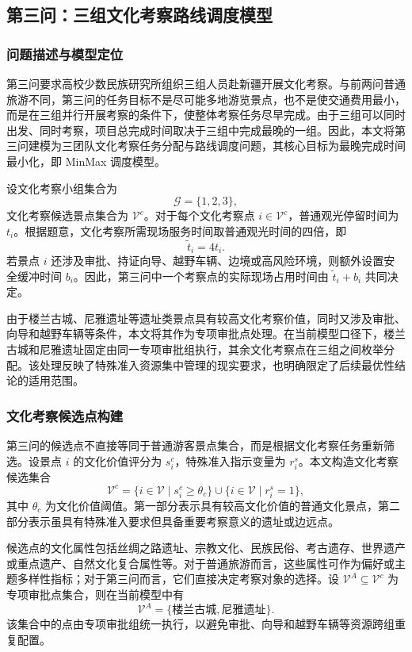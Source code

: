 \documentclass[UTF8,zihao=-4,a4paper]{ctexart}
\begin{document}
\subsection{第三问：三组文化考察路线调度模型}
\label{subsec:q3_model}

\subsubsection{问题描述与模型定位}
\label{subsubsec:q3_problem_position}

第三问要求高校少数民族研究所组织三组人员赴新疆开展文化考察。与前两问普通旅游不同，第三问的任务目标不是尽可能多地游览景点，也不是使交通费用最小，而是在三组并行开展考察的条件下，使整体考察任务尽早完成。由于三组可以同时出发、同时考察，项目总完成时间取决于三组中完成最晚的一组。因此，本文将第三问建模为三团队文化考察任务分配与路线调度问题，其核心目标为最晚完成时间最小化，即 MinMax 调度模型。

设文化考察小组集合为
\[
\mathcal{G}=\{1,2,3\},
\]
文化考察候选景点集合为 $\mathcal{V}^{c}$。对于每个文化考察点 $i\in\mathcal{V}^{c}$，普通观光停留时间为 $t_i$。根据题意，文化考察所需现场服务时间取普通观光时间的四倍，即
\[
\tilde{t}_i=4t_i.
\]
若景点 $i$ 还涉及审批、持证向导、越野车辆、边境或高风险环境，则额外设置安全缓冲时间 $b_i$。因此，第三问中一个考察点的实际现场占用时间由 $\tilde{t}_i+b_i$ 共同决定。

由于楼兰古城、尼雅遗址等遗址类景点具有较高文化考察价值，同时又涉及审批、向导和越野车辆等条件，本文将其作为专项审批点处理。在当前模型口径下，楼兰古城和尼雅遗址固定由同一专项审批组执行，其余文化考察点在三组之间枚举分配。该处理反映了特殊准入资源集中管理的现实要求，也明确限定了后续最优性结论的适用范围。

\subsubsection{文化考察候选点构建}
\label{subsubsec:q3_candidate_set}

第三问的候选点不直接等同于普通游客景点集合，而是根据文化考察任务重新筛选。设景点 $i$ 的文化价值评分为 $s_i^{c}$，特殊准入指示变量为 $r_i^{s}$。本文构造文化考察候选集合
\[
\mathcal{V}^{c}
=
\{i\in\mathcal{V}\mid s_i^{c}\geq \theta_c \}
\cup
\{i\in\mathcal{V}\mid r_i^{s}=1\},
\]
其中 $\theta_c$ 为文化价值阈值。第一部分表示具有较高文化价值的普通文化景点，第二部分表示虽具有特殊准入要求但具备重要考察意义的遗址或边远点。

候选点的文化属性包括丝绸之路遗址、宗教文化、民族民俗、考古遗存、世界遗产或重点遗产、自然文化复合属性等。对于普通旅游而言，这些属性可作为偏好或主题多样性指标；对于第三问而言，它们直接决定考察对象的选择。设 $\mathcal{V}^{A}\subseteq\mathcal{V}^{c}$ 为专项审批点集合，则在当前模型中有
\[
\mathcal{V}^{A}=\{\text{楼兰古城},\text{尼雅遗址}\}.
\]
该集合中的点由专项审批组统一执行，以避免审批、向导和越野车辆等资源跨组重复配置。
\end{document}
